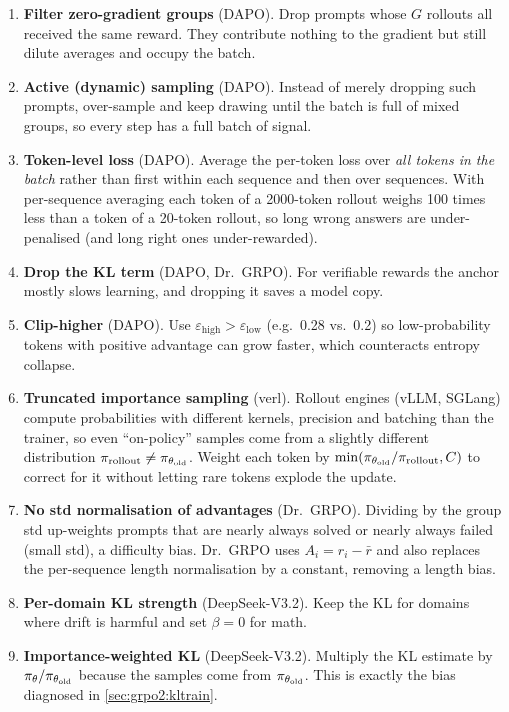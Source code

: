 \begin{enumerate}
\item \textbf{Filter zero-gradient groups} (DAPO). Drop prompts whose $G$ rollouts all
received the same reward. They contribute nothing to the gradient but still dilute averages
and occupy the batch.
\item \textbf{Active (dynamic) sampling} (DAPO). Instead of merely dropping such prompts,
over-sample and keep drawing until the batch is full of mixed groups, so every step has a
full batch of signal.
\item \textbf{Token-level loss} (DAPO). Average the per-token loss over \emph{all tokens in
the batch} rather than first within each sequence and then over sequences. With per-sequence
averaging each token of a 2000-token rollout weighs 100 times less than a token of a 20-token
rollout, so long wrong answers are under-penalised (and long right ones under-rewarded).
\item \textbf{Drop the KL term} (DAPO, Dr.~GRPO). For verifiable rewards the anchor mostly
slows learning, and dropping it saves a model copy.
\item \textbf{Clip-higher} (DAPO). Use $\varepsilon_{\text{high}}>\varepsilon_{\text{low}}$
(e.g.\ 0.28 vs.\ 0.2) so low-probability tokens with positive advantage can grow faster,
which counteracts entropy collapse.
\item \textbf{Truncated importance sampling} (verl). Rollout engines (vLLM, SGLang) compute
probabilities with different kernels, precision and batching than the trainer, so even ``on-policy''
samples come from a slightly different distribution $\pi_{\text{rollout}}\neq\pi_{\theta_{\text{old}}}$. Weight
each token by $\min(\pi_{\theta_{\text{old}}}/\pi_{\text{rollout}},C)$ to correct for it without letting rare
tokens explode the update.
\item \textbf{No std normalisation of advantages} (Dr.~GRPO). Dividing by the group std
up-weights prompts that are nearly always solved or nearly always failed (small std), a
difficulty bias. Dr.~GRPO uses $A_i=r_i-\bar r$ and also replaces the per-sequence length
normalisation by a constant, removing a length bias.
\item \textbf{Per-domain KL strength} (DeepSeek-V3.2). Keep the KL for domains where drift is
harmful and set $\beta=0$ for math.
\item \textbf{Importance-weighted KL} (DeepSeek-V3.2). Multiply the KL estimate by
$\pi_\theta/\pi_{\theta_{\text{old}}}$ because the samples come from $\pi_{\theta_{\text{old}}}$. This is exactly the bias diagnosed in
\cref{sec:grpo2:kltrain}.

\end{enumerate}
